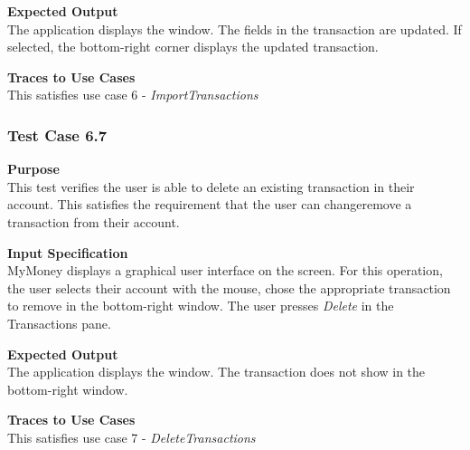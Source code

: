 \documentclass[12pt]{article}
\begin{document}
\noindent
{\bf Expected Output}\\
The application displays the window.    
The fields in the transaction are updated.
If selected, the bottom-right corner displays the updated transaction.

\noindent
    {\bf Traces to Use Cases}\\
    This satisfies use case 6 - \textit{ImportTransactions}

\clearpage %
\subsubsection{Test Case 6.7} \label{6.7}
\noindent
{\bf Purpose}\\
This test verifies the user is able to delete an existing transaction in their account.
This satisfies the requirement that the user can changeremove a transaction from their account.
                                                        
\noindent
{\bf Input Specification}\\
MyMoney displays a graphical user interface on the screen.
For this operation, the user selects their account with the mouse,
chose the appropriate transaction to remove in the bottom-right window.
The user presses \textit{Delete} in the Transactions pane.
                                                          

\noindent
{\bf Expected Output}\\
The application displays the window.       
The transaction does not show in the bottom-right window.

\noindent
{\bf Traces to Use Cases}\\
This satisfies use case 7 - \textit{DeleteTransactions}
\end{document}
